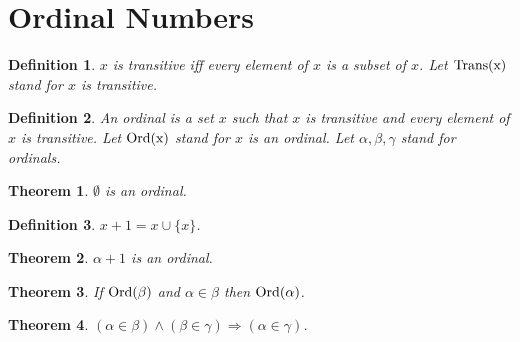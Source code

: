 \documentclass{article}
\newenvironment{forthel}{\begin{leftbar}}{\end{leftbar}}
\newtheorem{theorem}{Theorem}
\newtheorem{definition}{Definition}
\begin{document}
\section{Ordinal Numbers}

\begin{forthel}
[ordinal/-s]

\begin{definition} $x$ is \emph{transitive} iff
every element of $x$ is a subset of $x$.
Let $\rm{Trans}(x)$ stand for $x$ is transitive.
\end{definition}

\begin{definition} 
An \emph{ordinal} is a set $x$ such that $x$ is transitive and every element of $x$ is transitive.
Let $\rm{Ord}(x)$ stand for $x$ is an ordinal.
Let $\alpha, \beta, \gamma$ stand for ordinals.
\end{definition}

\begin{theorem} $\emptyset$ is an ordinal.
\end{theorem}

\begin{definition} $x + 1 = x \cup \{x\}$.
\end{definition}

\begin{theorem}
$\alpha + 1$ is an ordinal.
\end{theorem}

\begin{theorem} If $\rm{Ord}(\beta)$ and $\alpha \in \beta$ then
$\rm{Ord}(\alpha)$.
\end{theorem}

\begin{theorem} $(\alpha \in \beta) \wedge (\beta \in \gamma) 
\Rightarrow (\alpha \in \gamma)$.
\end{theorem}

\end{forthel}
\end{document}
